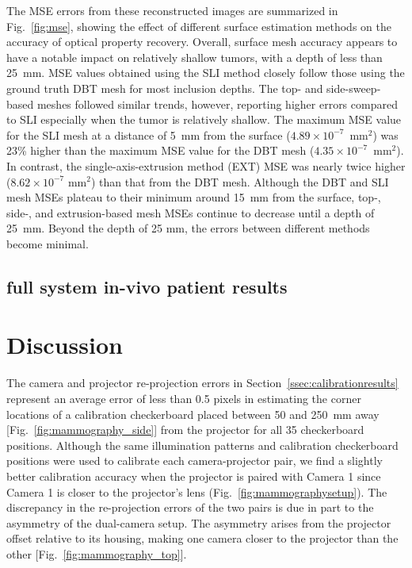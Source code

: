 The MSE errors from these reconstructed images are summarized in Fig.~\ref{fig:mse}, showing the effect of different surface estimation methods on the accuracy of optical property recovery. Overall, surface mesh accuracy appears to have a notable impact on relatively shallow tumors, with a depth of less than 25~mm. MSE values obtained using the SLI method closely follow those using the ground truth DBT mesh for most inclusion depths. The top- and side-sweep-based meshes followed similar trends, however, reporting higher errors compared to SLI especially when the tumor is relatively shallow. The maximum MSE value for the SLI mesh at a distance of 5~mm from the surface ($4.89\times 10^{-7}$~mm$^2$) was 23\% higher than the maximum MSE value for the DBT mesh ($4.35\times 10^{-7}$~mm$^2$). In contrast, the single-axis-extrusion method (EXT) MSE was nearly twice higher ($8.62\times 10^{-7}$ mm$^2$) than that from the DBT mesh. Although the DBT and SLI mesh MSEs plateau to their minimum around 15~mm from the surface, top-, side-, and extrusion-based mesh MSEs continue to decrease until a depth of 25~mm. Beyond the depth of 25 mm, the errors between different methods become minimal.

\subsection{full system in-vivo patient results}


\section{Discussion}
\label{chap:omci:discussion}
The camera and projector re-projection errors in Section~\ref{ssec:calibrationresults} represent an average error of less than 0.5 pixels in estimating the corner locations of a calibration checkerboard placed between 50 and 250~mm away [Fig.~\ref{fig:mammography_side}] from the projector for all 35 checkerboard positions. Although the same illumination patterns and calibration checkerboard positions were used to calibrate each camera-projector pair, we find a slightly better calibration accuracy when the projector is paired with Camera 1 since Camera 1 is closer to the projector's lens (Fig.~\ref{fig:mammographysetup}). The discrepancy in the re-projection errors of the two pairs is due in part to the asymmetry of the dual-camera setup. The asymmetry arises from the projector offset relative to its housing, making one camera closer to the projector than the other [Fig.~\ref{fig:mammography_top}]. 

